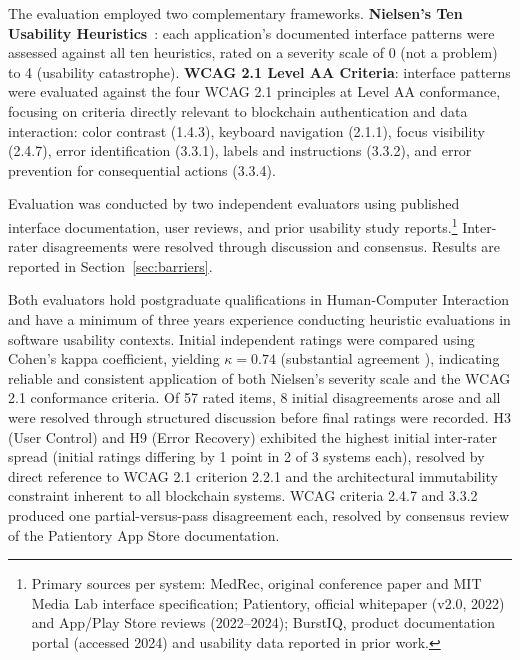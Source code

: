 \documentclass[journal,onecolumn]{IEEEtran}
\begin{document}
The evaluation employed two complementary frameworks. \textbf{Nielsen's Ten Usability Heuristics}~\cite{nielsen1994usability}: each application's documented interface patterns were assessed against all ten heuristics, rated on a severity scale of 0 (not a problem) to 4 (usability catastrophe). \textbf{WCAG 2.1 Level AA Criteria}: interface patterns were evaluated against the four WCAG 2.1 principles at Level AA conformance, focusing on criteria directly relevant to blockchain authentication and data interaction: color contrast (1.4.3), keyboard navigation (2.1.1), focus visibility (2.4.7), error identification (3.3.1), labels and instructions (3.3.2), and error prevention for consequential actions (3.3.4).

Evaluation was conducted by two independent evaluators using published interface documentation, user reviews, and prior usability study reports.\footnote{Primary sources per system: MedRec, original conference paper and MIT Media Lab interface specification; Patientory, official whitepaper (v2.0, 2022) and App/Play Store reviews (2022--2024); BurstIQ, product documentation portal (accessed 2024) and usability data reported in prior work.} Inter-rater disagreements were resolved through discussion and consensus. Results are reported in Section~\ref{sec:barriers}.



Both evaluators hold postgraduate qualifications in Human-Computer Interaction and have a minimum of three years experience conducting heuristic evaluations in software usability contexts. Initial independent ratings were compared using Cohen's kappa coefficient, yielding $\kappa = 0.74$ (substantial agreement \cite{landis1977measurement}), indicating reliable and consistent application of both Nielsen's severity scale and the WCAG 2.1 conformance criteria. Of 57 rated items, 8 initial disagreements arose and all were resolved through structured discussion before final ratings were recorded. H3 (User Control) and H9 (Error Recovery) exhibited the highest initial inter-rater spread (initial ratings differing by 1 point in 2 of 3 systems each), resolved by direct reference to WCAG 2.1 criterion 2.2.1 and the architectural immutability constraint inherent to all blockchain systems. WCAG criteria 2.4.7 and 3.3.2 produced one partial-versus-pass disagreement each, resolved by consensus review of the Patientory App Store documentation.




\end{document}
